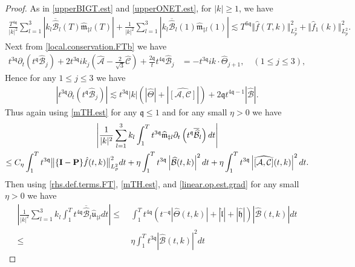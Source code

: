 \documentclass[reqno]{amsart}
\newcommand{\pv}{p}
\def\norm#1{\big\Vert#1\big\Vert}
\newcommand{\qq}{\mathfrak{q}}
\newcommand{\tq}{t^{\qq}}
\newcommand{\tmq}{t^{-\qq}}
\newcommand{\tTq}{t^{3\qq}}
\newcommand{\micro}{{\bf \{I- P\}}}
\newcommand{\highG}{\Theta}
\theoremstyle{definition}
\numberwithin{equation}{section}
\numberwithin{theorem}{section}
\begin{document}
\begin{proof}
As in \eqref{upperBIGT.est} and \eqref{upperONET.est}, for $|k|\geq 1$, we have 
\begin{align*}
 \frac{ T^{4\qq}}{|k|^2}
\sum_{l=1}^3 
    \left| k_l\overline{\widehat{\mathcal{B}}}_l(T) \widehat{\mathfrak{m}}_{\ddagger l} (T)
\right|
+ \frac{ 1}{|k|^2}
\sum_{l=1}^3 
\left| k_l\overline{\widehat{\mathcal{B}}}_l(1) \widehat{\mathfrak{m}}_{\ddagger l} (1)\right|
\lesssim
 T^{6\qq}\Vert \hat{f}(T,k)\Vert_{L^2_{\pv}}^2
 +
 \norm{ \hat{f}_1(k)}_{L^2_{\pv}}^2.
\end{align*}
Next from \eqref{local.conservation.FTb} we have 
\begin{align*}
\tTq\partial_t\left(\tq {\widehat{\mathcal{B}}}_j\right)
 +
2\tTq ik_j \left( \widehat{\mathcal{A}}
-\frac{2}{\sqrt{3}}
\widehat{\mathcal{C}}  \right)
+
\frac{2\qq }{t}t^{4\qq}\widehat{\mathcal{B}}_j
&=- \tTq ik \cdot \widehat{\highG}_{j+1}, \quad (1 \leq j \leq 3),
\end{align*}
Hence for any $1 \leq j \leq 3$ we have
\begin{align*}
  \left|  \tTq\partial_t\left(\tq {\widehat{\mathcal{B}}}_j\right) \right|
 \lesssim 
\tTq |k| \left(\left| \widehat{\highG}\right|+\left|\widehat{[\mathcal{A},\mathcal{C}]}\right|\right)
+
2\qq  t^{4\qq -1}\left|{\widehat{\mathcal{B}}}\right|.
\end{align*}
Thus again using \eqref{mTH.est} for any $\qq \leq 1$ and for any small $\eta>0$ we have
\begin{multline*}
    \left|
 \frac{1}{|k|^2 } 
 \sum_{l=1}^3 
   k_l \int_1^{T} \tTq \widehat{\mathfrak{m}}_{\ddagger l}\partial_t\left(\tq\overline{\widehat{\mathcal{B}}}_l\right)  dt
\right|
\\
\leq
C_\eta\int_1^{T} \tTq\norm{\micro \hat{f}(t,k)}_{L^2_{\pv}}^2dt
+
\eta \int^{T}_{1} \tTq \left|\widehat{{\mathcal{B}}}(t,k)\right|^2 dt 
+
\eta \int^{T}_{1} \tTq \left|\widehat{[\mathcal{A},\mathcal{C}]}(t,k)\right|^2 dt. 
\end{multline*}
Then using \eqref{rhs.def.terms.FT}, \eqref{mTH.est}, and \eqref{linear.op.est.grad} for any small $\eta>0$ we have
\begin{align*}
\left|  \frac{1 }{|k|^2}
\sum_{l=1}^3
k_l \int_1^{T}  t^{4\qq} \overline{\widehat{\mathcal{B}}}_l \widehat{\mathfrak{u}}_{\ddagger l} dt\right|
 \leq &~
\int_1^{T}
 t^{4\qq}\left( \tmq\left|\widehat{\highG}(t,k)\right|+\left| \widehat{\mathfrak{l}}\right|+\left| \widehat{\mathfrak{h}}\right|\right) \left|\widehat{{\mathcal{B}}}(t,k)\right| dt
 \\
  \leq &~
  \eta \int^{T}_{1} \tTq  \left|\widehat{{\mathcal{B}}}(t,k)\right|^2 dt

\end{align*}
\end{proof}
\end{document}
